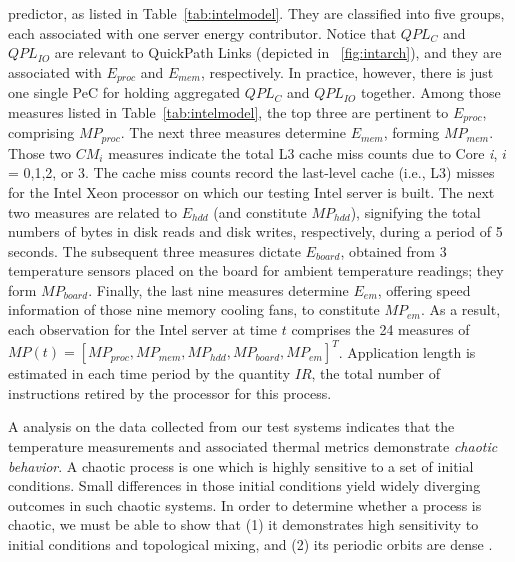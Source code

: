 \documentclass[times, 10pt,twocolumn]{IEEEtran}
\begin{document}
predictor, as listed in Table~\ref{tab:intelmodel}.  They are classified
into five groups, each associated with one server energy contributor.
Notice that $QPL_{C}$ and $QPL_{IO}$ are relevant to QuickPath Links
(depicted in \figurename~\ref{fig:intarch}), and they are associated
with $E_{proc}$ and $E_{mem}$, respectively.  In practice, however,
there is just one single PeC for holding aggregated $QPL_{C}$ and
$QPL_{IO}$ together.  Among those measures listed in
Table~\ref{tab:intelmodel}, the top three are pertinent to $E_{proc}$,
comprising $MP_{proc}$.  The next three measures determine $E_{mem}$,
forming $MP_{mem}$.  Those two $CM_{i}$ measures indicate the total L3
cache miss counts due to Core \textit{i}, $i$ = 0,1,2, or 3.  The cache
miss counts record the last-level cache (i.e., L3) misses for the Intel
Xeon processor on which our testing Intel server is built.  The next two
measures are related to $E_{hdd}$ (and constitute $MP_{hdd}$),
signifying the total numbers of bytes in disk reads and disk writes,
respectively, during a period of 5 seconds.  The subsequent three
measures dictate $E_{board}$, obtained from 3 temperature sensors placed
on the board for ambient temperature readings; they form $MP_{board}$.
Finally, the last nine measures determine $E_{em}$, offering speed
information of those nine memory cooling fans, to constitute $MP_{em}$.
As a result, each observation for the Intel server at time $t$ comprises
the 24 measures of $MP(t) =\left[MP_{proc}, MP_{mem}, MP_{hdd},
  MP_{board}, MP_{em}\right]^{T}$.  Application length is estimated in
each time period by the quantity $IR$, the total number of instructions
retired by the processor for this process.

A analysis on the data collected from our test systems indicates that
the temperature measurements and associated thermal metrics demonstrate
\textit{chaotic behavior}. A chaotic process is one which is highly
sensitive to a set of initial conditions.  Small differences in those
initial conditions yield widely diverging outcomes in such chaotic
systems.  In order to determine whether a process is chaotic, we must be
able to show that (1) it demonstrates high sensitivity to initial
conditions and topological mixing, and (2) its periodic orbits are dense
\cite{Sprott2003}.  
\end{document}
